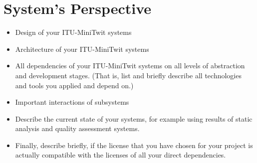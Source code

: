 \section{System's Perspective}

\begin{itemize}
  \item Design of your ITU-MiniTwit systems
  \item Architecture of your ITU-MiniTwit systems
  \item All dependencies of your ITU-MiniTwit systems on all levels of abstraction and development stages. (That is, list and briefly describe all technologies and tools you applied and depend on.)
  \item Important interactions of subsystems
  \item Describe the current state of your systems, for example using results of static analysis and quality assessment systems.
  \item Finally, describe briefly, if the license that you have chosen for your project is actually compatible with the licenses of all your direct dependencies.
  
\end{itemize}